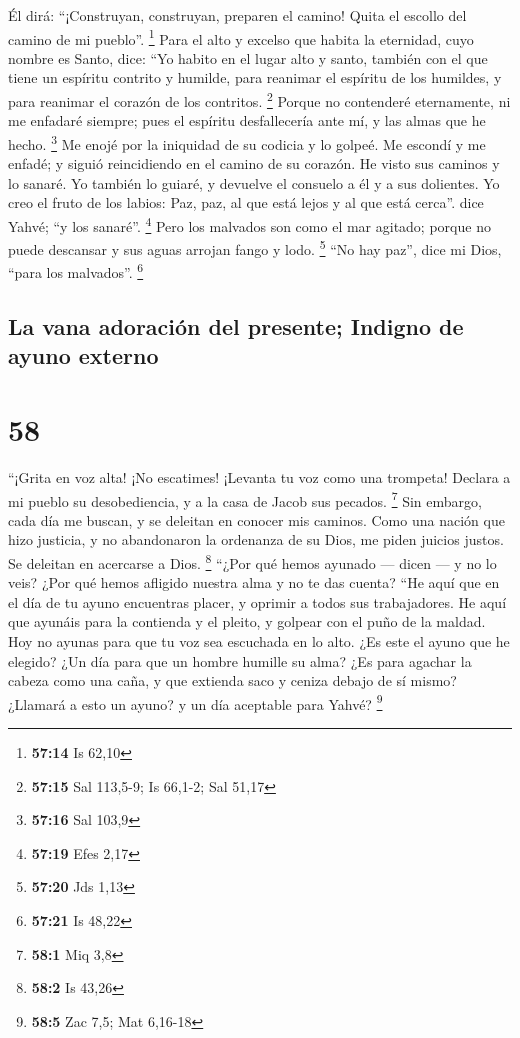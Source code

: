  Él dirá: ``¡Construyan, construyan, preparen el camino!
Quita el escollo del camino de mi pueblo''. \footnote{\textbf{57:14} Is
  62,10}  Para el alto y excelso que habita la eternidad,
cuyo nombre es Santo, dice: ``Yo habito en el lugar alto y santo,
también con el que tiene un espíritu contrito y humilde, para reanimar
el espíritu de los humildes, y para reanimar el corazón de los
contritos. \footnote{\textbf{57:15} Sal 113,5-9; Is 66,1-2; Sal 51,17}
 Porque no contenderé eternamente, ni me enfadaré
siempre; pues el espíritu desfallecería ante mí, y las almas que he
hecho. \footnote{\textbf{57:16} Sal 103,9}  Me enojé por
la iniquidad de su codicia y lo golpeé. Me escondí y me enfadé; y siguió
reincidiendo en el camino de su corazón.  He visto sus
caminos y lo sanaré. Yo también lo guiaré, y devuelve el consuelo a él y
a sus dolientes.  Yo creo el fruto de los labios: Paz,
paz, al que está lejos y al que está cerca''. dice Yahvé; ``y los
sanaré''. \footnote{\textbf{57:19} Efes 2,17}  Pero los
malvados son como el mar agitado; porque no puede descansar y sus aguas
arrojan fango y lodo. \footnote{\textbf{57:20} Jds 1,13} 
``No hay paz'', dice mi Dios, ``para los malvados''. \footnote{\textbf{57:21}
  Is 48,22}

\hypertarget{la-vana-adoraciuxf3n-del-presente-indigno-de-ayuno-externo}{%
\subsection{La vana adoración del presente; Indigno de ayuno
externo}\label{la-vana-adoraciuxf3n-del-presente-indigno-de-ayuno-externo}}

\hypertarget{section-57}{%
\section{58}\label{section-57}}

 ``¡Grita en voz alta! ¡No escatimes! ¡Levanta tu voz como
una trompeta! Declara a mi pueblo su desobediencia, y a la casa de Jacob
sus pecados. \footnote{\textbf{58:1} Miq 3,8}  Sin
embargo, cada día me buscan, y se deleitan en conocer mis caminos. Como
una nación que hizo justicia, y no abandonaron la ordenanza de su Dios,
me piden juicios justos. Se deleitan en acercarse a Dios. \footnote{\textbf{58:2}
  Is 43,26}  ``¿Por qué hemos ayunado --- dicen --- y no
lo veis? ¿Por qué hemos afligido nuestra alma y no te das cuenta? ``He
aquí que en el día de tu ayuno encuentras placer, y oprimir a todos sus
trabajadores.  He aquí que ayunáis para la contienda y el
pleito, y golpear con el puño de la maldad. Hoy no ayunas para que tu
voz sea escuchada en lo alto.  ¿Es este el ayuno que he
elegido? ¿Un día para que un hombre humille su alma? ¿Es para agachar la
cabeza como una caña, y que extienda saco y ceniza debajo de sí mismo?
¿Llamará a esto un ayuno? y un día aceptable para Yahvé? \footnote{\textbf{58:5}
  Zac 7,5; Mat 6,16-18}

